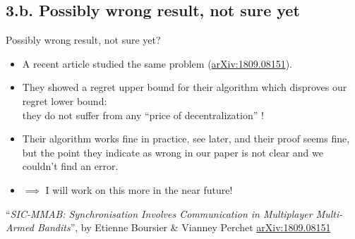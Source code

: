 \documentclass[12pt,english,ignorenonframetext,aspectratio=169,]{beamer}
\providecommand{\tightlist}{%
  \setlength{\itemsep}{0pt}\setlength{\parskip}{0pt}}
\begin{document}
\subsection{\hfill{}3.b. Possibly wrong result, not sure yet\hfill{}}

\begin{frame}{Possibly wrong result, not sure yet?}

\begin{itemize}\tightlist
\item
A recent article studied the same problem (\textcolor{blue}{\href{https://arxiv.org/abs/1809.08151}{arXiv:1809.08151}}).

\pause

\item
They showed a regret upper bound for their \SICMMAB{} algorithm which disproves our regret lower bound:\\
they do not suffer from any ``price of decentralization'' {\Sadey} !


\pause
\vspace*{15pt}

\item
Their algorithm works fine in practice, see later,
and their proof seems fine, but the point they indicate as wrong in our paper is not clear and we couldn't find an error.

\item
$\implies$ I will work on this more in the near future!
\end{itemize}

\vfill{}
\begin{footnotesize}
  ``\emph{SIC-MMAB: Synchronisation Involves Communication in Multiplayer Multi-Armed Bandits}'',
  by Etienne Boursier \& Vianney Perchet
  \textcolor{blue}{\href{https://arxiv.org/abs/1809.08151}{arXiv:1809.08151}}
\end{footnotesize}

\end{frame}
\end{document}

